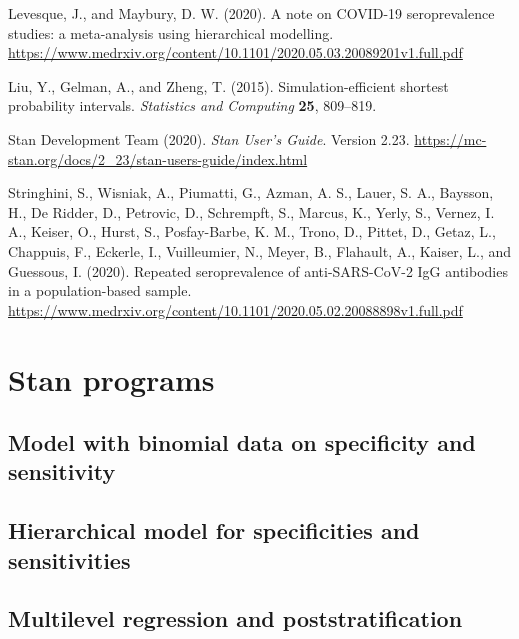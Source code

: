\documentclass[11pt]{article}
\begin{document}
\bibitem Levesque, J., and Maybury, D. W. (2020).  A note on COVID-19
  seroprevalence studies: a meta-analysis using hierarchical
  modelling.  {\small
    \url{https://www.medrxiv.org/content/10.1101/2020.05.03.20089201v1.full.pdf}}

\bibitem Liu, Y., Gelman, A., and Zheng, T. (2015).
  Simulation-efficient shortest probability intervals. {\em Statistics
    and Computing} {\bf 25}, 809--819.

\bibitem Stan Development Team (2020). {\em Stan User's Guide}. Version
  2.23. {\small \url{https://mc-stan.org/docs/2_23/stan-users-guide/index.html}}

\bibitem Stringhini, S., Wisniak, A., Piumatti, G., Azman, A. S.,
  Lauer, S. A., Baysson, H., De Ridder, D., Petrovic, D., Schrempft,
  S., Marcus, K., Yerly, S., Vernez, I. A., Keiser, O., Hurst, S.,
  Posfay-Barbe, K. M., Trono, D., Pittet, D., Getaz, L., Chappuis, F.,
  Eckerle, I., Vuilleumier, N., Meyer, B., Flahault, A., Kaiser, L.,
  and Guessous, I. (2020).  Repeated seroprevalence of anti-SARS-CoV-2
  IgG antibodies in a population-based sample.  {\small
    \url{https://www.medrxiv.org/content/10.1101/2020.05.02.20088898v1.full.pdf}}

\pagebreak
\appendix

\section{Stan programs}

\subsection{Model with binomial data on specificity and sensitivity}\label{stan2}

\vspace{-\baselineskip}
\begin{small}
  \begin{quotation}\noindent
    
  \end{quotation}
\end{small}


\subsection{Hierarchical model for specificities and sensitivities}\label{stan3}

\vspace{-\baselineskip}
\begin{small}
  \begin{quotation}\noindent
    
  \end{quotation}
\end{small}

\subsection{Multilevel regression and poststratification}\label{stan4}

\vspace{-\baselineskip}
\begin{small}
  \begin{quotation}\noindent
    
  \end{quotation}
\end{small}
\end{document}
